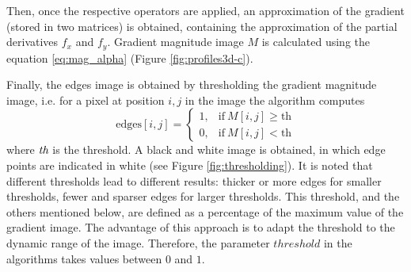 \documentclass{ipol}
\numberwithin{equation}{section}
\numberwithin{table}{section}
\begin{document}
Then, once the respective operators are applied, an approximation of the gradient (stored in two matrices) 
is obtained, containing the approximation of the partial derivatives $f_x$ and $f_y$. Gradient magnitude 
image $M$ is calculated using the equation \ref{eq:mag_alpha} (Figure \ref{fig:profiles3d-c}). 

Finally, the edges image is obtained by thresholding the gradient magnitude image, i.e. for a pixel at position $i,j$ in the image the algorithm computes
\begin{equation*}
	\mbox{edges}[i,j] = \begin{cases} 1,& \mbox{if}\ M[i,j]\geq\mbox{th} \\
									0,& \mbox{if}\ M[i,j]<\mbox{th}
					  \end{cases}
\end{equation*}
where $\emph{th}$ is the threshold. A black and white image is obtained, in which edge points are indicated in white (see Figure \ref{fig:thresholding}). 
It is noted that different thresholds lead to different results: thicker or more edges for smaller thresholds, fewer and sparser edges for larger thresholds. This threshold, and the others mentioned below, are defined as a percentage of the maximum value 
of the gradient image. The advantage of this approach is to adapt the threshold to the dynamic range of the image. 
Therefore, the parameter $threshold$ in the algorithms takes values ​​between $0$ and $1$.
\end{document}
